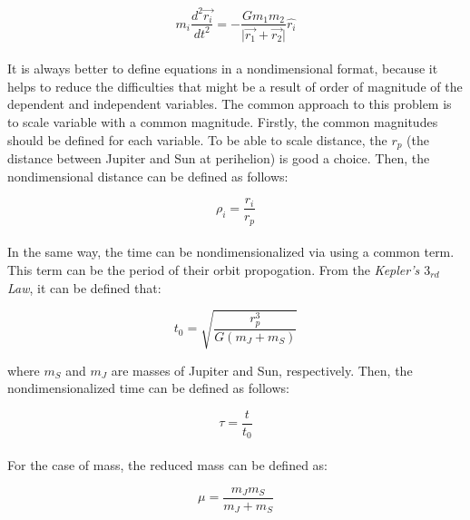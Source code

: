 \documentclass[letterpaper,12pt]{article}
\begin{document}
\begin{equation*}
    m_i \frac{d^2 \vec{r_i}}{dt^2} = -\frac{G m_1 m_2}{\lvert \vec{r_1} + \vec{r_2}  \rvert} \hat{r_i}
\end{equation*}

\paragraph{} It is always better to define equations in a nondimensional format, because it helps to reduce the difficulties that might be a result of order of magnitude of the dependent and independent variables. The common approach to this problem is to scale variable with a common magnitude. Firstly, the common magnitudes should be defined for each variable. To be able to scale distance, the $r_p$ (the distance between Jupiter and Sun at perihelion) is good a choice. Then, the nondimensional distance can be defined as follows:

\begin{equation*}
    \rho_i = \frac{r_i}{r_p}
\end{equation*}

\paragraph{} In the same way, the time can be nondimensionalized via using a common term. This term can be the period of their orbit propogation. From the \textit{Kepler's $3_{rd}$ Law}, it can be defined that:

\begin{equation*}
    t_0 = \sqrt{\frac{r_p^3}{G\left(m_J + m_S\right)}}
\end{equation*}

where $m_S$ and $m_J$ are masses of Jupiter and Sun, respectively. Then, the nondimensionalized time can be defined as follows:

\begin{equation*}
    \tau = \frac{t}{t_0}
\end{equation*}

\paragraph{} For the case of mass, the reduced mass can be defined as:

\begin{equation*}
    \mu = \frac{m_J m_S}{m_J + m_S}
\end{equation*}
\end{document}
